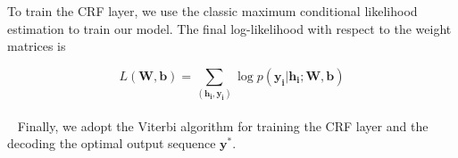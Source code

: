 To train the CRF layer, we use the classic maximum conditional likelihood estimation to train our model. 
The final log-likelihood with respect to the weight matrices is 

$$ L(\mathbf{W},\mathbf{b}) = \sum_{(\mathbf{h_i}, \mathbf{y_i})}  \log p(\mathbf{y_i}|\mathbf{h_i}; \mathbf{W},\mathbf{b}) $$
~\\~
Finally, we adopt the Viterbi algorithm for training the CRF layer and the decoding the optimal output sequence $\mathbf{y^*}$.



